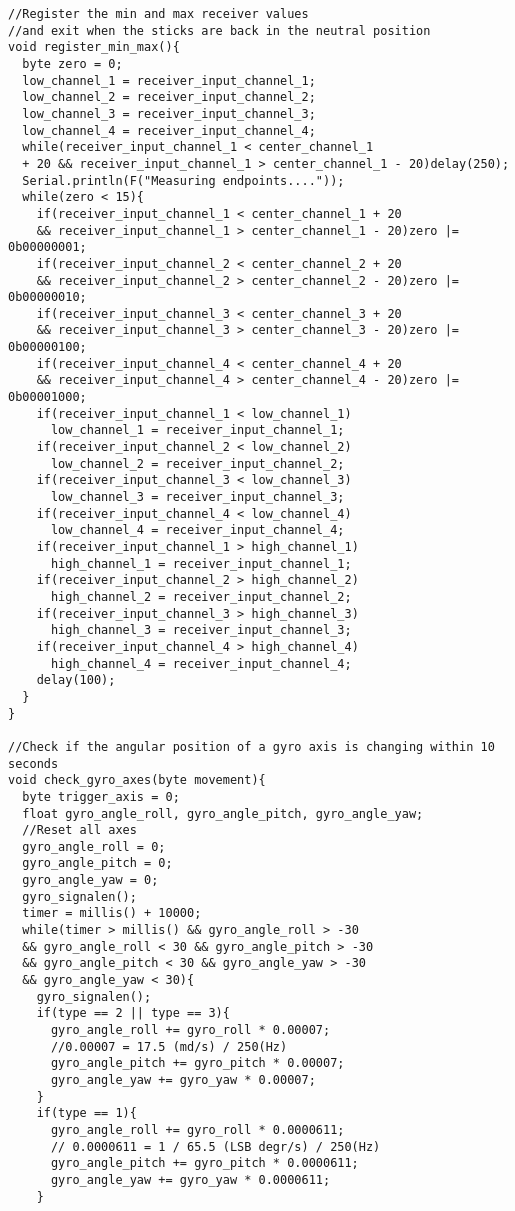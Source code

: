 \begin{lstlisting}
//Register the min and max receiver values 
//and exit when the sticks are back in the neutral position
void register_min_max(){
  byte zero = 0;
  low_channel_1 = receiver_input_channel_1;
  low_channel_2 = receiver_input_channel_2;
  low_channel_3 = receiver_input_channel_3;
  low_channel_4 = receiver_input_channel_4;
  while(receiver_input_channel_1 < center_channel_1 
  + 20 && receiver_input_channel_1 > center_channel_1 - 20)delay(250);
  Serial.println(F("Measuring endpoints...."));
  while(zero < 15){
    if(receiver_input_channel_1 < center_channel_1 + 20 
    && receiver_input_channel_1 > center_channel_1 - 20)zero |= 0b00000001;
    if(receiver_input_channel_2 < center_channel_2 + 20 
    && receiver_input_channel_2 > center_channel_2 - 20)zero |= 0b00000010;
    if(receiver_input_channel_3 < center_channel_3 + 20 
    && receiver_input_channel_3 > center_channel_3 - 20)zero |= 0b00000100;
    if(receiver_input_channel_4 < center_channel_4 + 20 
    && receiver_input_channel_4 > center_channel_4 - 20)zero |= 0b00001000;
    if(receiver_input_channel_1 < low_channel_1)
      low_channel_1 = receiver_input_channel_1;
    if(receiver_input_channel_2 < low_channel_2)
      low_channel_2 = receiver_input_channel_2;
    if(receiver_input_channel_3 < low_channel_3)
      low_channel_3 = receiver_input_channel_3;
    if(receiver_input_channel_4 < low_channel_4)
      low_channel_4 = receiver_input_channel_4;
    if(receiver_input_channel_1 > high_channel_1)
      high_channel_1 = receiver_input_channel_1;
    if(receiver_input_channel_2 > high_channel_2)
      high_channel_2 = receiver_input_channel_2;
    if(receiver_input_channel_3 > high_channel_3)
      high_channel_3 = receiver_input_channel_3;
    if(receiver_input_channel_4 > high_channel_4)
      high_channel_4 = receiver_input_channel_4;
    delay(100);
  }
}

//Check if the angular position of a gyro axis is changing within 10 seconds
void check_gyro_axes(byte movement){
  byte trigger_axis = 0;
  float gyro_angle_roll, gyro_angle_pitch, gyro_angle_yaw;
  //Reset all axes
  gyro_angle_roll = 0;
  gyro_angle_pitch = 0;
  gyro_angle_yaw = 0;
  gyro_signalen();
  timer = millis() + 10000;    
  while(timer > millis() && gyro_angle_roll > -30 
  && gyro_angle_roll < 30 && gyro_angle_pitch > -30 
  && gyro_angle_pitch < 30 && gyro_angle_yaw > -30 
  && gyro_angle_yaw < 30){
    gyro_signalen();
    if(type == 2 || type == 3){
      gyro_angle_roll += gyro_roll * 0.00007;              
      //0.00007 = 17.5 (md/s) / 250(Hz)
      gyro_angle_pitch += gyro_pitch * 0.00007;
      gyro_angle_yaw += gyro_yaw * 0.00007;
    }
    if(type == 1){
      gyro_angle_roll += gyro_roll * 0.0000611;          
      // 0.0000611 = 1 / 65.5 (LSB degr/s) / 250(Hz)
      gyro_angle_pitch += gyro_pitch * 0.0000611;
      gyro_angle_yaw += gyro_yaw * 0.0000611;
    }
    

\end{lstlisting}

